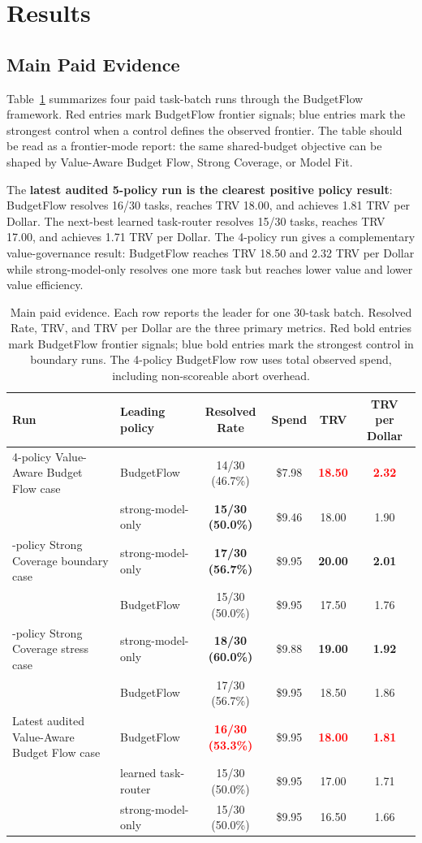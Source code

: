 \documentclass{article}
\newcommand{\method}{BudgetFlow\xspace}
\newcommand{\trv}{TRV\xspace}
\newcommand{\pos}[1]{\textcolor{red}{\textbf{#1}}}
\newcommand{\ctrl}[1]{\textcolor{bfblue}{\textbf{#1}}}
\begin{document}
\section{Results}
\label{sec:results}
\subsection{Main Paid Evidence}
Table~\ref{tab:main-evidence} summarizes four paid task-batch runs through the \method framework. Red entries mark BudgetFlow frontier signals; blue entries mark the strongest control when a control defines the observed frontier. The table should be read as a frontier-mode report: the same shared-budget objective can be shaped by Value-Aware Budget Flow, Strong Coverage, or Model Fit.

The \textbf{latest audited 5-policy run is the clearest positive policy result}: \method resolves 16/30 tasks, reaches \trv 18.00, and achieves 1.81 \trv per Dollar. The next-best learned task-router resolves 15/30 tasks, reaches \trv 17.00, and achieves 1.71 \trv per Dollar. The 4-policy run gives a complementary value-governance result: \method reaches \trv 18.50 and 2.32 \trv per Dollar while strong-model-only resolves one more task but reaches lower value and lower value efficiency.

\begin{table}[t]
\centering
\small
\begin{tabular}{llcccc}
\toprule
Run & Leading policy & Resolved Rate & Spend & TRV & TRV per Dollar \\
\midrule
4-policy Value-Aware Budget Flow case & \method & 14/30 (46.7\%) & \$7.98 & \pos{18.50} & \pos{2.32} \\
 & strong-model-only & \ctrl{15/30 (50.0\%)} & \$9.46 & 18.00 & 1.90 \\
\addlinespace
5-policy Strong Coverage boundary case & strong-model-only & \ctrl{17/30 (56.7\%)} & \$9.95 & \ctrl{20.00} & \ctrl{2.01} \\
 & \method & 15/30 (50.0\%) & \$9.95 & 17.50 & 1.76 \\
\addlinespace
5-policy Strong Coverage stress case & strong-model-only & \ctrl{18/30 (60.0\%)} & \$9.88 & \ctrl{19.00} & \ctrl{1.92} \\
 & \method & 17/30 (56.7\%) & \$9.95 & 18.50 & 1.86 \\
\addlinespace
Latest audited Value-Aware Budget Flow case & \method & \pos{16/30 (53.3\%)} & \$9.95 & \pos{18.00} & \pos{1.81} \\
 & learned task-router & 15/30 (50.0\%) & \$9.95 & 17.00 & 1.71 \\
 & strong-model-only & 15/30 (50.0\%) & \$9.95 & 16.50 & 1.66 \\
\bottomrule
\end{tabular}
\caption{Main paid evidence. Each row reports the leader for one 30-task batch. Resolved Rate, \trv, and \trv per Dollar are the three primary metrics. Red bold entries mark BudgetFlow frontier signals; blue bold entries mark the strongest control in boundary runs. The 4-policy BudgetFlow row uses total observed spend, including non-scoreable abort overhead.}
\label{tab:main-evidence}
\end{table}
\end{document}
